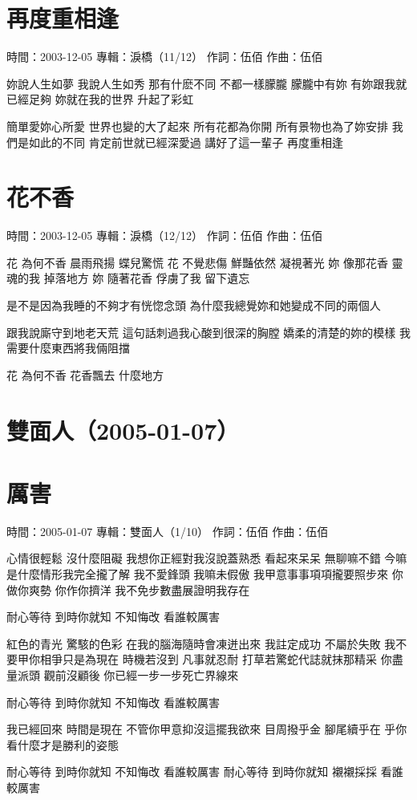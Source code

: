 \documentclass[UTF8,a4paper,oneside,twocolumn,12pt]{ctexbook}
\newcommand{\infopair}[2]{\textbullet #1：#2}
\newcommand{\zc}[1][伍佰]{\infopair{作詞}{#1}}
\newcommand{\zq}[1][伍佰]{\infopair{作曲}{#1}}
\newcommand{\zj}[1]{\infopair{專輯}{#1}}
\newcommand{\sj}[1]{\infopair{時間}{#1}}
\newenvironment{info}{\begin{flushleft}\kaishu
	}
	{\end{flushleft}\normalsize\yahei\par}
\newenvironment{lyric}{
	}
{}
\begin{document}
\section{再度重相逢}
\begin{info}
	\sj{2003-12-05}
	\zj{淚橋（11/12）}
	\zc
	\zq
\end{info}
\begin{lyric}
	妳說人生如夢 我說人生如秀
	那有什麽不同 不都一樣朦朧
	朦朧中有妳 有妳跟我就已經足夠
	妳就在我的世界 升起了彩虹

	簡單愛妳心所愛 世界也變的大了起來
	所有花都為你開 所有景物也為了妳安排
	我們是如此的不同 肯定前世就已經深愛過
	講好了這一輩子 再度重相逢
\end{lyric}

\section{花不香}
\begin{info}
	\sj{2003-12-05}
	\zj{淚橋（12/12）}
	\zc
	\zq
\end{info}
\begin{lyric}
	花 為何不香 晨雨飛揚 蝶兒驚慌
	花 不覺悲傷 鮮豔依然 凝視著光
	妳 像那花香 靈魂的我 掉落地方
	妳 隨著花香 俘虜了我 留下遺忘

	是不是因為我睡的不夠才有恍惚念頭
	為什麼我總覺妳和她變成不同的兩個人

	跟我說廝守到地老天荒
	這句話刺過我心酸到很深的胸膛
	嬌柔的清楚的妳的模樣
	我需要什麼東西將我倆阻擋

	花 為何不香 花香飄去 什麼地方
\end{lyric}

\section*{雙面人（2005-01-07）}
\section{厲害}
\begin{info}
	\sj{2005-01-07}
	\zj{雙面人（1/10）}
	\zc
	\zq
\end{info}
\begin{lyric}
	心情很輕鬆 沒什麼阻礙 我想你正經對我沒說蓋熟悉
	看起來呆呆 無聊嘛不錯 今嘛是什麼情形我完全攏了解
	我不愛鋒頭 我嘛未假傲 我甲意事事項項攏要照步來
	你做你爽勢 你作你擠洋 我不免步數盡展證明我存在

	耐心等待 到時你就知
	不知悔改 看誰較厲害

	紅色的青光 驚駭的色彩 在我的腦海隨時會凍迸出來
	我註定成功 不屬於失敗 我不要甲你相爭只是為現在
	時機若沒到 凡事就忍耐 打草若驚蛇代誌就抹那精采
	你盡量派頭 觀前沒顧後 你已經一步一步死亡界線來

	耐心等待 到時你就知
	不知悔改 看誰較厲害

	我已經回來 時間是現在 不管你甲意抑沒這擺我欲來
	目周撥乎金 腳尾續乎在 乎你看什麼才是勝利的姿態

	耐心等待 到時你就知
	不知悔改 看誰較厲害
	耐心等待 到時你就知
	襯襯採採 看誰較厲害
\end{lyric}
\end{document}
